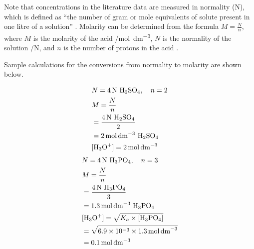 \documentclass[11pt, letterpaper]{article}
\begin{document}
Note that concentrations in the literature data are measured in
normality (\unit{N}), which is defined as
``the number of gram or mole equivalents of solute present in one litre of a solution'' \cite{Normality}.
Molarity can be determined from the
formula \(M = \frac{N}{n}\), where \(M\) is the molarity of the
acid /\unit{mol.dm^{-3}}, \(N\) is the normality of the solution
/\unit{N}, and \(n\) is the number of protons in the acid \cite{gonzalesHowCalculateNormality2017}.

Sample calculations for the conversions
from normality to molarity are shown below.

\begingroup
\allowdisplaybreaks
\begin{paracol}{2}
    \begin{align*}
         & N = \SI{4}{N}~ \ce{H_2SO_4},\quad n = 2
        \\
         & M = \frac{N}{n}
        \\
         & = \frac{\SI{4}{N}~ \ce{H_2SO_4}}{2}
        \\
         & = \SI{2}{mol.dm^{-3}}~ \ce{H_2SO_4}
        \\
         & \ce{[H_3O+]} = \SI{2}{mol.dm^{-3}}
    \end{align*}
    \switchcolumn
    \begin{align*}
         & N = \SI{4}{N}~ \ce{H_3PO_4},\quad n = 3
        \\
         & M = \frac{N}{n}
        \\
         & = \frac{\SI{4}{N}~ \ce{H_3PO_4}}{3}
        \\
         & = \SI{1.3}{mol.dm^{-3}}~ \ce{H_3PO_4}
        \\
         & \ce{[H_3O+]} = \sqrt{K_a \times \ce{[H_3PO_4]}}
        \\
         & = \sqrt{6.9 \times 10^{-3} \times \SI{1.3}{mol.dm^{-3}}}
        \\
         & = \SI{0.1}{mol.dm^{-3}}
    \end{align*}
\end{paracol}
\endgroup
\end{document}
